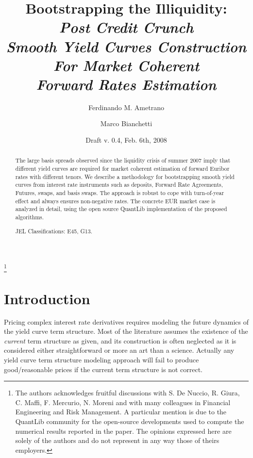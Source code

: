 \documentclass[11pt,reqno]{amsart}
\begin{document}
\title[Smooth Yield Curves For Euribor Estimation]{Bootstrapping the Illiquidity: \\ \emph{Post Credit Crunch \\
Smooth Yield Curves Construction \\
For Market Coherent \\
Forward Rates Estimation}}

\author{Ferdinando M. Ametrano}
\address{Financial Engineering, Banca IMI, Piazzetta G. Dell'Amore 3, 20121
Milan Italy, ferdinando.ametrano@bancaimi.com}
\author{Marco Bianchetti}
\address{Risk Management, Banca IntesaSanpaolo, Piazza G. Ferrari 10, 20121
Milan Italy, marco.bianchetti@intesasanpaolo.com}

\thanks{The authors acknowledges fruitful discussions with S. De Nuccio, R. Giura, C. Maffi, F. Mercurio, N. Moreni and with many colleagues in Financial Engineering and Risk Management. A particular mention is due to the QuantLib community for the open-source developments used to compute the numerical results reported in the paper. The opinions expressed here are solely of the authors and do not represent in any way those of theirs employers.}

\date{Draft v. 0.4, Feb. 6th, 2008}

\begin{abstract}
The large basis spreads observed since the liquidity crisis of summer 2007 imply that different yield curves are required for market coherent estimation of forward Euribor rates with different tenors. We describe a methodology for bootstrapping smooth yield curves from interest rate instruments such as deposits, Forward Rate Agreements, Futures, swaps, and basis swaps. The approach is robust to cope with turn-of-year effect and always ensures non-negative rates. The concrete EUR market case is analyzed in detail, using the open source QuantLib implementation of the proposed algorithms.

JEL Classifications: E45, G13.

\end{abstract}

\maketitle

\section{\label{SecIntro}Introduction}
Pricing complex interest rate derivatives requires modeling the future dynamics of the yield curve term structure. Most of the literature assumes the existence of the \textit{current} term structure as given, and its construction is often neglected as it is considered either straightforward or more an art than a science. Actually any yield curve term structure modeling approach will fail to produce good/reasonable prices if the current term structure is not correct.
\end{document}
